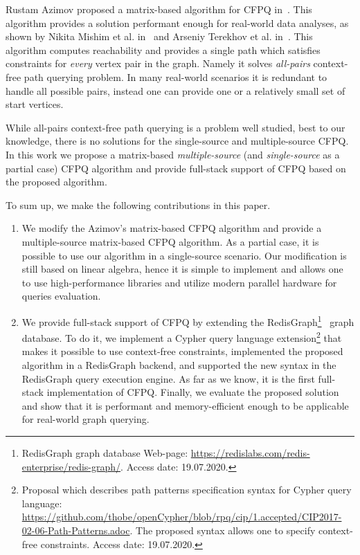 Rustam Azimov proposed a matrix-based algorithm for CFPQ in~\cite{Azimov:2018:CPQ:3210259.3210264}.
This algorithm provides a solution performant enough for real-world data analyses, as shown by Nikita Mishim et al. in~\cite{Mishin:2019:ECP:3327964.3328503} and Arseniy Terekhov et al. in~\cite{10.1145/3398682.3399163}.
This algorithm computes reachability and provides a single path which satisfies constraints for \emph{every} vertex pair in the graph.
Namely it solves \emph{all-pairs} context-free path querying problem.
In many real-world scenarios it is redundant to handle all possible pairs, instead one can provide one or a relatively small set of start vertices.

While all-pairs context-free path querying is a problem well studied, best to our knowledge, there is no solutions for the single-source and multiple-source CFPQ.
In this work we propose a matrix-based \textit{multiple-source} (and \textit{single-source} as a partial case) CFPQ algorithm and provide full-stack support of CFPQ based on the proposed algorithm.

To sum up, we make the following contributions in this paper.
\begin{enumerate}
	\item We modify the Azimov's matrix-based CFPQ algorithm and provide a multiple-source matrix-based CFPQ algorithm.
	As a partial case, it is possible to use our algorithm in a single-source scenario.
	Our modification is still based on linear algebra, hence it is simple to implement and allows one to use high-performance libraries and utilize modern parallel hardware for queries evaluation.
	\item We provide full-stack support of CFPQ by extending the RedisGraph\footnote{RedisGraph graph database Web-page: \url{https://redislabs.com/redis-enterprise/redis-graph/}. Access date: 19.07.2020.}~\cite{8778293} graph database.
	To do it, we implement a Cypher query language extension\footnote{Proposal which describes path patterns specification syntax for Cypher query language: \url{https://github.com/thobe/openCypher/blob/rpq/cip/1.accepted/CIP2017-02-06-Path-Patterns.adoc}. The proposed syntax allows one to specify context-free constraints. Access date: 19.07.2020.} that makes it possible to use context-free constraints, implemented the proposed algorithm in a RedisGraph backend, and supported the new syntax in the RedisGraph query execution engine. As far as we know, it is the first full-stack implementation of CFPQ.
	Finally, we evaluate the proposed solution and show that it is performant and memory-efficient enough to be applicable for real-world graph querying.
\end{enumerate}